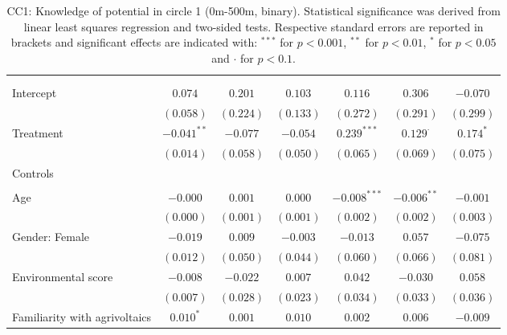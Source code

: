 \begin{center}
\begin{small}
\begin{longtable}{l@{} c@{} c@{} c@{} c@{} c@{} c@{}}
\hline
\endhead
\hline
\endfoot
\hline
\multicolumn{7}{l}{\tiny{
}}\\
\caption{CC1: Knowledge of potential in circle 1 (0m-500m, binary). Statistical significance was derived from linear least squares regression and two-sided tests. Respective standard errors are reported in brackets and significant effects are indicated with: $^{***}$ for $p < 0.001$, $^{**}$ for $p < 0.01$, $^*$ for $p < 0.05$ and $\cdot$ for $p < 0.1$.}
\label{table:coefficients}
\endlastfoot \\
Intercept                           & $0.074$       & $0.201$   & $0.103$   & $0.116$        & $0.306$         & $-0.070$    \\
                                    & $(0.058)$     & $(0.224)$ & $(0.133)$ & $(0.272)$      & $(0.291)$       & $(0.299)$   \\
Treatment                           & $-0.041^{**}$ & $-0.077$  & $-0.054$  & $0.239^{***}$  & $0.129^{\cdot}$ & $0.174^{*}$ \\
                                    & $(0.014)$     & $(0.058)$ & $(0.050)$ & $(0.065)$      & $(0.069)$       & $(0.075)$   \\
Controls                            &               &           &           &                &                 &             \\
                                    &               &           &           &                &                 &             \\
\quad Age                           & $-0.000$      & $0.001$   & $0.000$   & $-0.008^{***}$ & $-0.006^{**}$   & $-0.001$    \\
                                    & $(0.000)$     & $(0.001)$ & $(0.001)$ & $(0.002)$      & $(0.002)$       & $(0.003)$   \\
\quad Gender: Female                & $-0.019$      & $0.009$   & $-0.003$  & $-0.013$       & $0.057$         & $-0.075$    \\
                                    & $(0.012)$     & $(0.050)$ & $(0.044)$ & $(0.060)$      & $(0.066)$       & $(0.081)$   \\
\quad Environmental score           & $-0.008$      & $-0.022$  & $0.007$   & $0.042$        & $-0.030$        & $0.058$     \\
                                    & $(0.007)$     & $(0.028)$ & $(0.023)$ & $(0.034)$      & $(0.033)$       & $(0.036)$   \\
\quad Familiarity with agrivoltaics & $0.010^{*}$   & $0.001$   & $0.010$   & $0.002$        & $0.006$         & $-0.009$    \\

\end{longtable}
\end{small}
\end{center}
